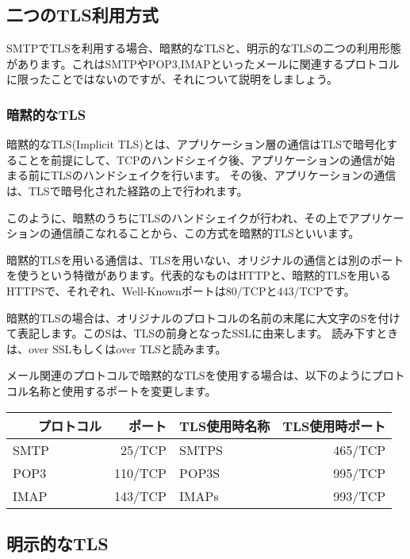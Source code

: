 \subsection{二つのTLS利用方式}

SMTPでTLSを利用する場合、暗黙的なTLSと、明示的なTLSの二つの利用形態があります。これはSMTPやPOP3,IMAPといったメールに関連するプロトコルに限ったことではないのですが、それについて説明をしましょう。

\subsubsection{暗黙的なTLS}

暗黙的なTLS(Implicit TLS)とは、アプリケーション層の通信はTLSで暗号化することを前提にして、TCPのハンドシェイク後、アプリケーションの通信が始まる前にTLSのハンドシェイクを行います。
その後、アプリケーションの通信は、TLSで暗号化された経路の上で行われます。

このように、暗黙のうちにTLSのハンドシェイクが行われ、その上でアプリケーションの通信顔こなれることから、この方式を暗黙的TLSといいます。

暗黙的TLSを用いる通信は、TLSを用いない、オリジナルの通信とは別のポートを使うという特徴があります。代表的なものはHTTPと、暗黙的TLSを用いるHTTPSで、それぞれ、Well-Knownポートは80/TCPと443/TCPです。

暗黙的TLSの場合は、オリジナルのプロトコルの名前の末尾に大文字のSを付けて表記します。このSは、TLSの前身となったSSLに由来します。
読み下すときは、over SSLもしくはover TLSと読みます。

メール関連のプロトコルで暗黙的なTLSを使用する場合は、以下のようにプロトコル名称と使用するポートを変更します。

\begin{table}[htb]
  \begin{tabular}{lrlr} \hline
  　　プロトコル & ポート & TLS使用時名称 & TLS使用時ポート \\ \hline \hline
    SMTP & 25/TCP & SMTPS & 465/TCP \\
    POP3 & 110/TCP & POP3S & 995/TCP \\
    IMAP & 143/TCP & IMAPs & 993/TCP \\ \hline
  \end{tabular}
\end{table}

\subsection{明示的なTLS}

